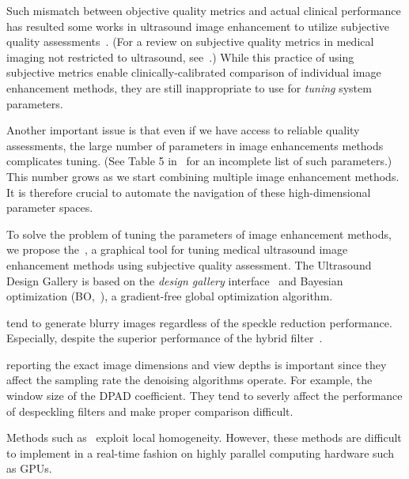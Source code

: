 Such mismatch between objective quality metrics and actual clinical performance has resulted some works in ultrasound image enhancement to utilize subjective quality assessments~\cite{loizou_quality_2006, hemmsen_ultrasound_2010, wong_monte_2012, kang_new_2016, mishra_edge_2018}.
(For a review on subjective quality metrics in medical imaging not restricted to ultrasound, see~\cite{chow_review_2016}.)
While this practice of using subjective metrics enable clinically-calibrated comparison of individual image enhancement methods, they are still inappropriate to use for \textit{tuning} system parameters.

Another important issue is that even if we have access to reliable quality assessments, the large number of parameters in image enhancements methods complicates tuning.
(See Table 5 in~\cite{finn_echocardiographic_2011} for an incomplete list of such parameters.)
This number grows as we start combining multiple image enhancement methods.
It is therefore crucial to automate the navigation of these high-dimensional parameter spaces. 

To solve the problem of tuning the parameters of image enhancement methods, we propose the~\usdg, a graphical tool for tuning medical ultrasound image enhancement methods using subjective quality assessment.
The Ultrasound Design Gallery is based on the \textit{design gallery} interface~\cite{brochu_bayesian_2010, 10.1145/3072959.3073598, koyama_sequential_2020, phan_color_2018, pmlr-v119-mikkola20a} and Bayesian optimization (BO,~\cite{shahriari_taking_2016}), a gradient-free global optimization algorithm.

\cite{deng_speckle_2011, wong_monte_2012, hu_cluster_2016, singh_hybrid_2017, nagare_multi_2017} tend to generate blurry images regardless of the speckle reduction performance.
Especially, despite the superior performance of the hybrid filter~\cite{singh_hybrid_2017}.

reporting the exact image dimensions and view depths is important since they affect the sampling rate the denoising algorithms operate.
For example, the window size of the DPAD coefficient.
They tend to severly affect the performance of despeckling filters and make proper comparison difficult.

Methods such as~\cite{hutchison_probabilisticdriven_2010, bini_despeckling_2014} exploit local homogeneity.
However, these methods are difficult to implement in a real-time fashion on highly parallel computing hardware such as GPUs.

